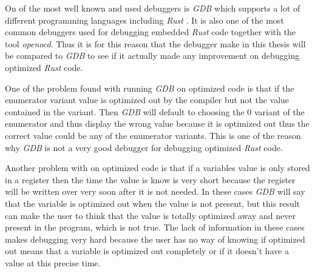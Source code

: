 
On of the most well known and used debuggers is \emph{GDB} which supports a lot of different programming languages including \emph{Rust} \cite{gdb}.
It is also one of the most common debuggers used for debugging embedded \emph{Rust} code together with the tool \emph{openocd}.
Thus it is for this reason that the debugger make in this thesis will be compared to \emph{GDB} to see if it actually made any improvement on debugging optimized \emph{Rust} code.


One of the problem found with running \emph{GDB} on optimized code is that if the enumerator variant value is optimized out by the compiler but not the value contained in the variant.
Then \emph{GDB} will default to choosing the $0$ variant of the enumerator and thus display the wrong value because it is optimized out thus the correct value could be any of the enumerator variants.
This is one of the reason why \emph{GDB} is not a very good debugger for debugging optimized \emph{Rust} code. %

Another problem with  on optimized code is that if a variables value is only stored in a register then the time the value is know is very short because the register will be written over very soon after it is not needed.
In these cases \emph{GDB} will say that the variable is optimized out when the value is not present, but this result can make the user to think that the value is totally optimized away and never present in the program, which is not true.
The lack of information in these cases makes debugging very hard because the user has no way of knowing if optimized out means that a variable is optimized out completely or if it doesn't have a value at this precise time.

